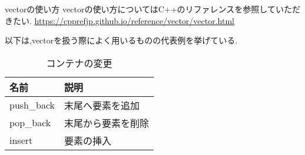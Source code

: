 \documentclass[xdvipdfmx, 8pt, t]{beamer}
\begin{document}
\begin{frame}{vectorの使い方}
    vectorの使い方についてはC++のリファレンスを参照していただきたい.
    \url{https://cpprefjp.github.io/reference/vector/vector.html}
    
    以下は,vectorを扱う際によく用いるものの代表例を挙げている.
    \begin{table}[h]
        \centering
        \begin{tabular}{|l|l|}
            \hline
            名前 & 説明\\
            \hline
            push\_back & 末尾へ要素を追加\\
            pop\_back & 末尾から要素を削除\\
            insert & 要素の挿入\\
            \hline
        \end{tabular}
        \caption{コンテナの変更}
        \label{tab:my_label}
    \end{table}
\end{frame}
\end{document}
